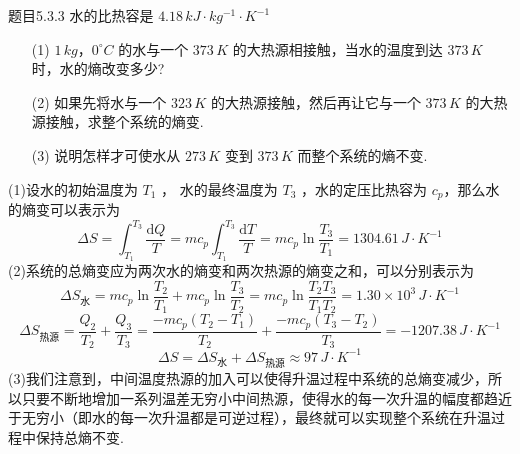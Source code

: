 \begin{question}{题目5.3.3}
    水的比热容是 $4.18 \,\si{kJ \cdot kg^{-1} \cdot K^{-1}}$
    \begin{enumerate}
        \item[(1)] $1 \,\si{kg}$，$0^\circ C$ 的水与一个 $373 \,\si{K}$ 的大热源相接触，当水的温度到达 $373 \,\si{K}$ 时，水的熵改变多少?
        \item[(2)] 如果先将水与一个 $323 \,\si{K}$ 的大热源接触，然后再让它与一个 $373 \,\si{K}$ 的大热源接触，求整个系统的熵变.
        \item[(3)] 说明怎样才可使水从 $273 \,\si{K}$ 变到 $373 \,\si{K}$ 而整个系统的熵不变.
    \end{enumerate}
\end{question}
\begin{solution}
    (1)设水的初始温度为 $T_1$ ， 水的最终温度为 $T_3$ ，水的定压比热容为 $c_p$，那么水的熵变可以表示为
    $$
        \Delta{S} = \int_{T_1}^{T_3} \frac{\mathrm{d}Q}{T}
        = mc_p\int_{T_1}^{T_3} \frac{\mathrm{d}T}{T}
        = mc_p\ln\frac{T_3}{T_1}
        = 1304.61 \,\si{J \cdot K^{-1}}
    $$
    (2)系统的总熵变应为两次水的熵变和两次热源的熵变之和，可以分别表示为
    $$
        \Delta{S}_{\text{水}}
        = mc_p\ln\frac{T_2}{T_1} + mc_p\ln\frac{T_3}{T_2}
        = mc_p\ln\frac{T_2T_3}{T_1T_2}
        = 1.30 \times 10^3 \,\si{J \cdot K^{-1}}
    $$
    $$
        \Delta{S}_{\text{热源}}
        = \frac{Q_2}{T_2} + \frac{Q_3}{T_3}
        = \frac{-mc_p(T_2-T_1)}{T_2} + \frac{-mc_p(T_3-T_2)}{T_3}
        = -1207.38 \,\si{J \cdot K^{-1}}
    $$
    $$
        \Delta{S} = \Delta{S}_{\text{水}} + \Delta{S}_{\text{热源}}
        \approx 97 \,\si{J \cdot K^{-1}}
    $$
    (3)我们注意到，中间温度热源的加入可以使得升温过程中系统的总熵变减少，所以只要不断地增加一系列温差无穷小中间热源，使得水的每一次升温的幅度都趋近于无穷小（即水的每一次升温都是可逆过程），最终就可以实现整个系统在升温过程中保持总熵不变.
\end{solution}


